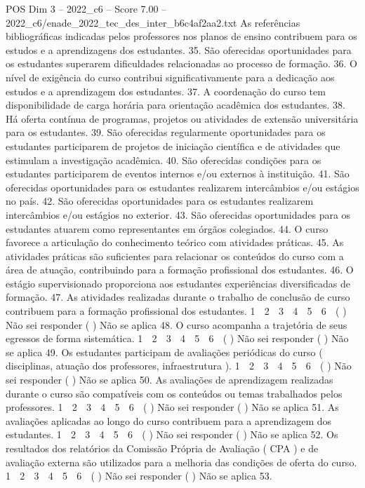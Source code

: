 \begin{textsample}{POS Dim 3 – 2022\_c6 – Score 7.00 – 2022\_c6/enade\_2022\_tec\_des\_inter\_b6c4af2aa2.txt}
As referências bibliográficas indicadas pelos professores nos planos de ensino contribuem para os estudos e a aprendizagens dos estudantes. 35.
São oferecidas oportunidades para os estudantes superarem dificuldades relacionadas ao processo de formação. 36.
O nível de exigência do curso contribui significativamente para a dedicação aos estudos e a aprendizagem dos estudantes. 37.
A coordenação do curso tem disponibilidade de carga horária para orientação acadêmica dos estudantes. 38.
Há oferta contínua de programas, projetos ou atividades de extensão universitária para os estudantes. 39.
São oferecidas regularmente oportunidades para os estudantes participarem de projetos de iniciação científica e de atividades que estimulam a investigação acadêmica. 40.
São oferecidas condições para os estudantes participarem de eventos internos e/ou externos à instituição. 41.
São oferecidas oportunidades para os estudantes realizarem intercâmbios e/ou estágios no país. 42.
São oferecidas oportunidades para os estudantes realizarem intercâmbios e/ou estágios no exterior. 43.
São oferecidas oportunidades para os estudantes atuarem como representantes em órgãos colegiados. 44.
O curso favorece a articulação do conhecimento teórico com atividades práticas. 45.
As atividades práticas são suficientes para relacionar os conteúdos do curso com a área de atuação, contribuindo para a formação profissional dos estudantes. 46.
O estágio supervisionado proporciona aos estudantes experiências diversificadas de formação. 47.
As atividades realizadas durante o trabalho de conclusão de curso contribuem para a formação profissional dos estudantes. 1 ⃝ 2 ⃝ 3 ⃝ 4 ⃝ 5 ⃝ 6 ⃝ ( ) Não sei responder ( ) Não se aplica 48.
O curso acompanha a trajetória de seus egressos de forma sistemática. 1 ⃝ 2 ⃝ 3 ⃝ 4 ⃝ 5 ⃝ 6 ⃝ ( ) Não sei responder ( ) Não se aplica 49.
Os estudantes participam de avaliações periódicas do curso ( disciplinas, atuação dos professores, infraestrutura ). 1 ⃝ 2 ⃝ 3 ⃝ 4 ⃝ 5 ⃝ 6 ⃝ ( ) Não sei responder ( ) Não se aplica 50.
As avaliações de aprendizagem realizadas durante o curso são compatíveis com os conteúdos ou temas trabalhados pelos professores. 1 ⃝ 2 ⃝ 3 ⃝ 4 ⃝ 5 ⃝ 6 ⃝ ( ) Não sei responder ( ) Não se aplica 51.
As avaliações aplicadas ao longo do curso contribuem para a aprendizagem dos estudantes. 1 ⃝ 2 ⃝ 3 ⃝ 4 ⃝ 5 ⃝ 6 ⃝ ( ) Não sei responder ( ) Não se aplica 52.
Os resultados dos relatórios da Comissão Própria de Avaliação ( CPA ) e de avaliação externa são utilizados para a melhoria das condições de oferta do curso. 1 ⃝ 2 ⃝ 3 ⃝ 4 ⃝ 5 ⃝ 6 ⃝ ( ) Não sei responder ( ) Não se aplica 53.

\end{textsample}
